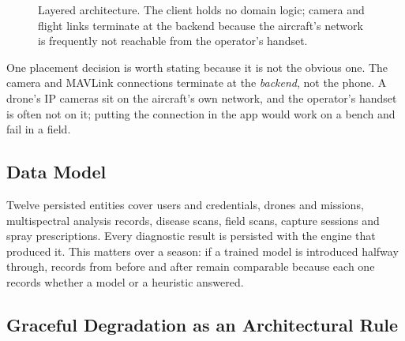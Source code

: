 \documentclass[conference]{IEEEtran}
\begin{document}
\begin{figure}[!t]
\centering
{}
\caption{Layered architecture. The client holds no domain logic; camera and
flight links terminate at the backend because the aircraft's network is
frequently not reachable from the operator's handset.}
\label{fig:arch}
\end{figure}

One placement decision is worth stating because it is not the obvious one. The
camera and MAVLink connections terminate at the \emph{backend}, not the phone.
A drone's IP cameras sit on the aircraft's own network, and the operator's
handset is often not on it; putting the connection in the app would work on a
bench and fail in a field.

\subsection{Data Model}

Twelve persisted entities cover users and credentials, drones and missions,
multispectral analysis records, disease scans, field scans, capture sessions
and spray prescriptions. Every diagnostic result is persisted with the engine
that produced it. This matters over a season: if a trained model is introduced
halfway through, records from before and after remain comparable because each
one records whether a model or a heuristic answered.

\subsection{Graceful Degradation as an Architectural Rule}
\end{document}
